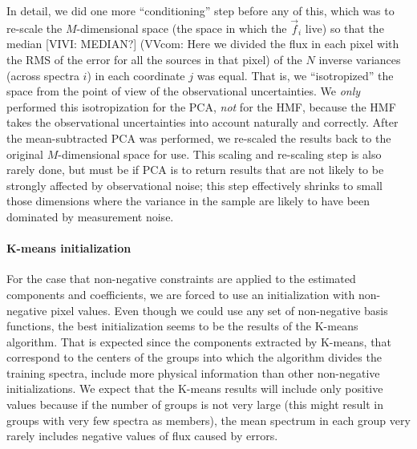 \documentclass[12pt,preprint]{aastex}
\begin{document}
In detail, we did one more ``conditioning'' step before any of this,
which was to re-scale the $M$-dimensional space (the space in which
the $\vec{f}_i$ live) so that the median [VIVI: MEDIAN?] (VVcom: Here 
we divided the flux in each pixel with the RMS of the error for all 
the sources in that pixel) of the $N$
inverse variances (across spectra $i$) in each coordinate $j$ was
equal.  That is, we ``isotropized'' the space from the point of view
of the observational uncertainties.  We \emph{only} performed this
isotropization for the PCA, \emph{not} for the HMF, because the HMF
takes the observational uncertainties into account naturally and
correctly.  After the mean-subtracted PCA was performed, we re-scaled
the results back to the original $M$-dimensional space for use.  This
scaling and re-scaling step is also rarely done, but must be if PCA is
to return results that are not likely to be strongly affected by
observational noise; this step effectively shrinks to small those
dimensions where the variance in the sample are likely to have been
dominated by measurement noise.

\paragraph{K-means initialization}
For the case that non-negative constraints are applied to the
estimated components and coefficients, we are forced to use an
initialization with non-negative pixel values. Even though we could
use any set of non-negative basis functions, the best initialization
seems to be the results of the K-means algorithm. That is expected
since the components extracted by K-means, that correspond to the
centers of the groups into which the algorithm divides the training
spectra, include more physical information than other non-negative
initializations. We expect that the K-means results will include only
positive values because if the number of groups is not very large
(this might result in groups with very few spectra as members), the
mean spectrum in each group very rarely includes negative values of
flux caused by errors.
\end{document}
